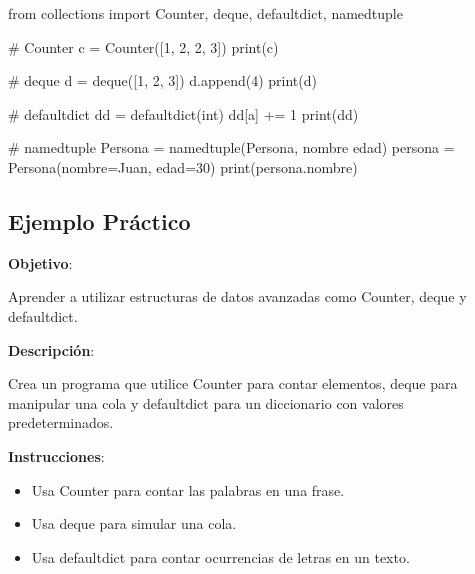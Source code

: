 \documentclass[
  a4paper,
  DIV=11,
  numbers=noendperiod,
  onepage,
  openany]{scrreprt}
\newenvironment{Shaded}{\begin{snugshade}}{\end{snugshade}}
\newcommand{\BuiltInTok}[1]{\textcolor[rgb]{0.00,0.23,0.31}{#1}}
\newcommand{\CommentTok}[1]{\textcolor[rgb]{0.37,0.37,0.37}{#1}}
\newcommand{\DecValTok}[1]{\textcolor[rgb]{0.68,0.00,0.00}{#1}}
\newcommand{\ImportTok}[1]{\textcolor[rgb]{0.00,0.46,0.62}{#1}}
\newcommand{\NormalTok}[1]{\textcolor[rgb]{0.00,0.23,0.31}{#1}}
\newcommand{\OperatorTok}[1]{\textcolor[rgb]{0.37,0.37,0.37}{#1}}
\newcommand{\StringTok}[1]{\textcolor[rgb]{0.13,0.47,0.30}{#1}}
\begin{document}
\begin{Shaded}
\begin{Highlighting}[]
\ImportTok{from}\NormalTok{ collections }\ImportTok{import}\NormalTok{ Counter, deque, defaultdict, namedtuple}

\CommentTok{\# Counter}
\NormalTok{c }\OperatorTok{=}\NormalTok{ Counter([}\DecValTok{1}\NormalTok{, }\DecValTok{2}\NormalTok{, }\DecValTok{2}\NormalTok{, }\DecValTok{3}\NormalTok{])}
\BuiltInTok{print}\NormalTok{(c)}

\CommentTok{\# deque}
\NormalTok{d }\OperatorTok{=}\NormalTok{ deque([}\DecValTok{1}\NormalTok{, }\DecValTok{2}\NormalTok{, }\DecValTok{3}\NormalTok{])}
\NormalTok{d.append(}\DecValTok{4}\NormalTok{)}
\BuiltInTok{print}\NormalTok{(d)}

\CommentTok{\# defaultdict}
\NormalTok{dd }\OperatorTok{=}\NormalTok{ defaultdict(}\BuiltInTok{int}\NormalTok{)}
\NormalTok{dd[}\StringTok{\textquotesingle{}a\textquotesingle{}}\NormalTok{] }\OperatorTok{+=} \DecValTok{1}
\BuiltInTok{print}\NormalTok{(dd)}

\CommentTok{\# namedtuple}
\NormalTok{Persona }\OperatorTok{=}\NormalTok{ namedtuple(}\StringTok{\textquotesingle{}Persona\textquotesingle{}}\NormalTok{, }\StringTok{\textquotesingle{}nombre edad\textquotesingle{}}\NormalTok{)}
\NormalTok{persona }\OperatorTok{=}\NormalTok{ Persona(nombre}\OperatorTok{=}\StringTok{\textquotesingle{}Juan\textquotesingle{}}\NormalTok{, edad}\OperatorTok{=}\DecValTok{30}\NormalTok{)}
\BuiltInTok{print}\NormalTok{(persona.nombre)}
\end{Highlighting}
\end{Shaded}

\subsection{Ejemplo Práctico}\label{ejemplo-pruxe1ctico-7}

\textbf{Objetivo}:

Aprender a utilizar estructuras de datos avanzadas como Counter, deque y
defaultdict.

\textbf{Descripción}:

Crea un programa que utilice Counter para contar elementos, deque para
manipular una cola y defaultdict para un diccionario con valores
predeterminados.

\textbf{Instrucciones}:

\begin{itemize}
\item
  Usa Counter para contar las palabras en una frase.
\item
  Usa deque para simular una cola.
\item
  Usa defaultdict para contar ocurrencias de letras en un texto.
\end{itemize}
\end{document}
